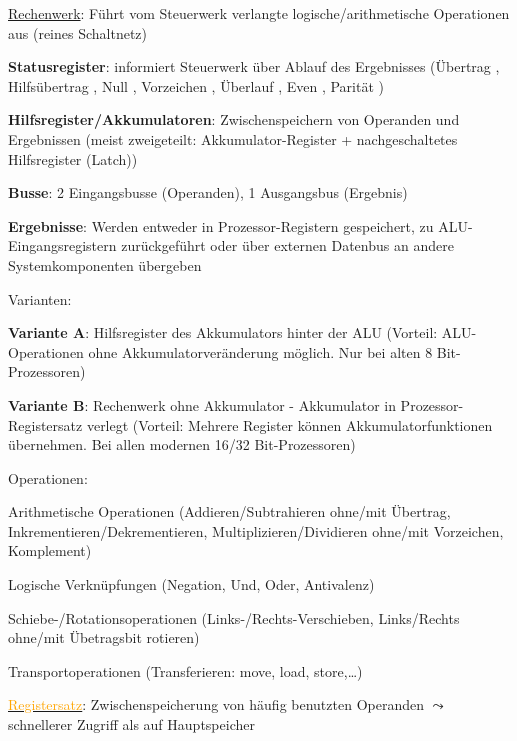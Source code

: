 \begin{items}
	\item \underline{\textcolor{green!60!black}{Rechenwerk}}: Führt vom Steuerwerk verlangte logische/arithmetische Operationen aus (reines Schaltnetz)
	\begin{enumeration}
		\item \textbf{Statusregister}: informiert Steuerwerk über Ablauf des Ergebnisses (Übertrag , Hilfsübertrag , Null , Vorzeichen , Überlauf , Even , Parität )
		\item \textbf{Hilfsregister/Akkumulatoren}: Zwischenspeichern von Operanden und Ergebnissen (meist zweigeteilt: Akkumulator-Register  + nachgeschaltetes Hilfsregister  (Latch))
		\item \textbf{Busse}: 2 Eingangsbusse (Operanden), 1 Ausgangsbus (Ergebnis)
		\item \textbf{Ergebnisse}: Werden entweder in Prozessor-Registern gespeichert, zu ALU-Eingangsregistern zurückgeführt oder über externen Datenbus an andere Systemkomponenten übergeben
	\end{enumeration}
	\item Varianten:
	\begin{enumeration}
		\item \textbf{Variante A}: Hilfsregister des Akkumulators hinter der ALU (Vorteil: ALU-Operationen ohne Akkumulatorveränderung möglich. Nur bei alten 8 Bit-Prozessoren)
		\item \textbf{Variante B}: Rechenwerk ohne Akkumulator - Akkumulator in Prozessor-Registersatz verlegt (Vorteil: Mehrere Register können Akkumulatorfunktionen übernehmen. Bei allen modernen 16/32 Bit-Prozessoren)
	\end{enumeration}

	\newpage

	\item Operationen:
	\begin{enumeration}
		\item Arithmetische Operationen (Addieren/Subtrahieren ohne/mit Übertrag, Inkrementieren/Dekrementieren, Multiplizieren/Dividieren ohne/mit Vorzeichen, Komplement)
		\item Logische Verknüpfungen (Negation, Und, Oder, Antivalenz)
		\item Schiebe-/Rotationsoperationen (Links-/Rechts-Verschieben, Links/Rechts ohne/mit Übetragsbit rotieren)
		\item Transportoperationen (Transferieren: move, load, store,\dots)
	\end{enumeration}

	\item \underline{\textcolor{orange}{Registersatz}}: Zwischenspeicherung von häufig benutzten Operanden $\leadsto$ schnellerer Zugriff als auf Hauptspeicher
\end{items}